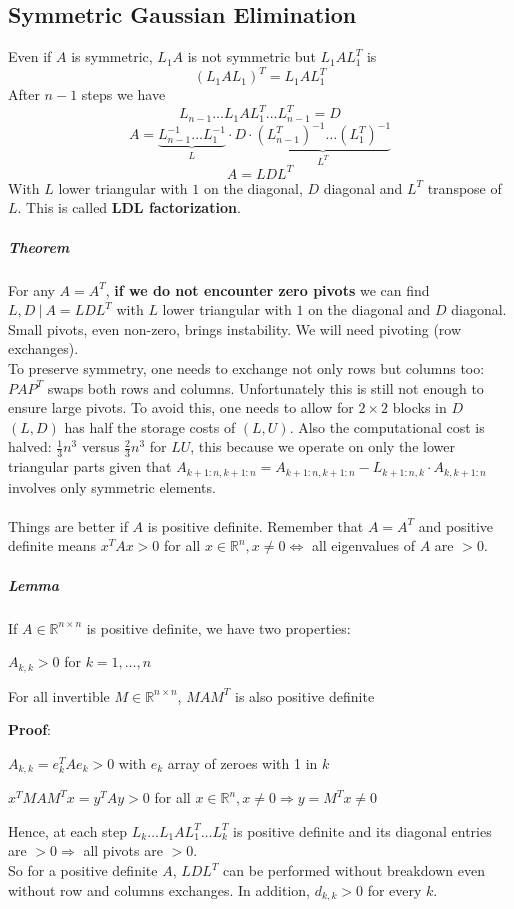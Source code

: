 \documentclass[10pt]{report}
\begin{document}
\subsection{Symmetric Gaussian Elimination} Even if $A$ is symmetric, $L_1A$ is not symmetric but $L_1AL_1^T$ is
$$(L_1AL_1)^T = L_1AL_1^T$$
After $n-1$ steps we have $$L_{n-1}\ldots L_1AL_1^T\ldots L_{n-1}^T = D$$
$$A = \underset{L}{\underbrace{L_{n-1}^{-1}\ldots L_1^{-1}}}\cdot D\cdot \underset{L^T}{\underbrace{(L_{n-1}^T)^{-1}\ldots(L_1^T)^{-1}}}$$
$$A = L D L^T$$
With $L$ lower triangular with $1$ on the diagonal, $D$ diagonal and $L^T$ transpose of $L$. This is called \textbf{LDL factorization}.
\subparagraph{Theorem} For any $A=A^T$, \textbf{if we do not encounter zero pivots} we can find $L,D\:|\:A = L DL^T$ with $L$ lower triangular with $1$ on the diagonal and $D$ diagonal.\\
Small pivots, even non-zero, brings instability. We will need pivoting (row exchanges).\\
To preserve symmetry, one needs to exchange not only rows but columns too: $PAP^T$ swaps both rows and columns. Unfortunately this is still not enough to ensure large pivots. To avoid this, one needs to allow for $2\times 2$ blocks in $D$\\
$(L,D)$ has half the storage costs of $(L,U)$. Also the computational cost is halved: $\frac{1}{3}n^3$ versus $\frac{2}{3}n^3$ for $LU$, this because we operate on only the lower triangular parts given that $A_{k+1:n,k+1:n} = A_{k+1:n,k+1:n}-L_{k+1:n,k}\cdot A_{k,k+1:n}$ involves only symmetric elements.\\\\
Things are better if $A$ is positive definite. Remember that $A = A^T$ and positive definite means $x^TAx>0$ for all $x\in \mathbb{R}^n,x\neq 0\Leftrightarrow$ all eigenvalues of $A$ are $>0$.
\subparagraph{Lemma} If $A\in \mathbb{R}^{n\times n}$ is positive definite, we have two properties:
\begin{list}{}{}
	\item $A_{k,k}>0$ for $k=1,\ldots,n$
	\item For all invertible $M\in \mathbb{R}^{n\times n}$, $MAM^T$ is also positive definite
\end{list}
\textbf{Proof}: \begin{list}{}{}
	\item $A_{k,k}=e_k^TAe_k > 0$ with $e_k$ array of zeroes with 1 in $k$
	\item $x^TMAM^Tx = y^TAy > 0$ for all $x\in \mathbb{R}^n, x\neq 0\Rightarrow y= M^Tx \neq 0$
\end{list}
Hence, at each step $L_k\ldots L_1AL_1^T\ldots L_k^T$ is positive definite and its diagonal entries are $>0\Rightarrow$ all pivots are $>0$.\\
So for a positive definite $A$, $LDL^T$ can be performed without breakdown even without row and columns exchanges. In addition, $d_{k,k}>0$ for every $k$.
\end{document}
